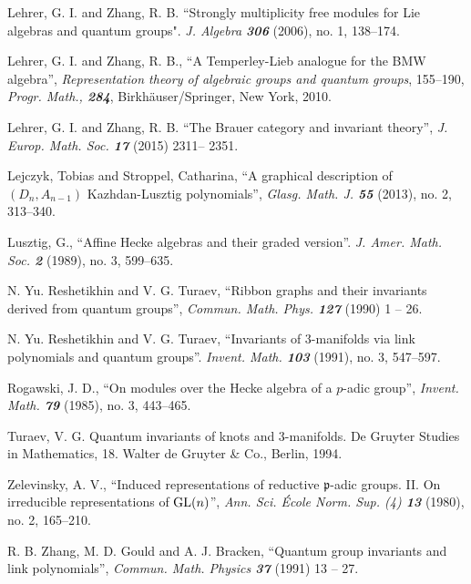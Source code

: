 \documentclass[12pt]{amsart}
\theoremstyle{definition}
\theoremstyle{remark}
\numberwithin{equation}{section}
\newcommand{\GL}{{\rm{GL}}}
\begin{document}
\begin{thebibliography}{9999}
 Lehrer, G. I. and Zhang, R. B. ``Strongly multiplicity free modules for Lie algebras and quantum groups". 
{\sl J. Algebra \bf 306} (2006), no. 1, 138--174.

  Lehrer, G. I. and  Zhang, R. B., ``A Temperley-Lieb analogue for the BMW algebra'',
{\sl Representation theory of algebraic groups and quantum groups}, 155--190, {\sl Progr. Math., \bf 284}, Birkh{\"a}user/Springer, New York, 2010.

 Lehrer, G. I. and Zhang, R. B.  ``The Brauer category and invariant theory'', 
{\sl J. Europ. Math. Soc. \bf 17}  (2015) 2311-- 2351. 

  Lejczyk, Tobias and Stroppel, Catharina,  ``A graphical description of $(D_n,A_{n-1})$ Kazhdan-Lusztig polynomials'',
{\sl Glasg. Math. J. \bf 55} (2013), no. 2, 313--340. 

  Lusztig, G., 
``Affine Hecke algebras and their graded version''. {\sl J. Amer. Math. Soc. \bf 2} (1989), no. 3, 599--635.

 N. Yu. Reshetikhin and V. G. Turaev, ``Ribbon graphs and their invariants derived from quantum groups'',  
{\sl Commun. Math. Phys. \bf 127} (1990)  1 -- 26.

N. Yu. Reshetikhin and V. G. Turaev, ``Invariants of 
$3$-manifolds via link polynomials and quantum groups''. 
{\sl  Invent. Math. \bf 103} (1991), no. 3, 547--597. 

  Rogawski, J. D.,  ``On modules over the Hecke algebra of a $p$-adic group'',
{\sl Invent. Math. \bf 79} (1985), no. 3, 443--465.

Turaev, V. G. Quantum invariants of knots and 3-manifolds. De Gruyter Studies in Mathematics, 18. Walter de Gruyter \& Co., Berlin, 1994.

  Zelevinsky, A. V.,  ``Induced representations of reductive $\mathfrak p$-adic groups. II. On irreducible representations of $\GL(n)$'',
{\sl  Ann. Sci. \'Ecole Norm. Sup. (4) \bf 13} (1980), no. 2, 165--210. 

 R. B. Zhang, M. D. Gould and A. J. Bracken,  
``Quantum group invariants and link polynomials'', 
{\sl Commun. Math. Physics \bf 37} (1991) 13 -- 27.  

\end{thebibliography}
\end{document}
